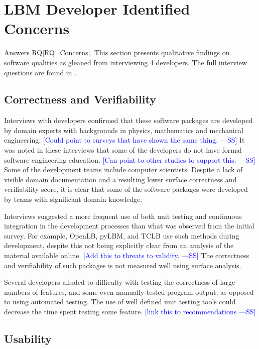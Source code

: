 \documentclass[final, 3p, times, authoryear]{elsarticle}
\newcommand{\authornote}[3]{\textcolor{#1}{[#3 ---#2]}}
\newcommand{\authornote}[3]{}
\newcommand{\wss}[1]{\authornote{blue}{SS}{#1}} %
\newcommand{\rqref}[1]{RQ\ref{#1}}
\begin{document}
\section{LBM Developer Identified Concerns} \label{Sec_Concerns}

Answers \rqref{RQ_Concerns}.  This section presents qualitative findings on
software qualities as gleaned from interviewing 4 developers. The full interview
questions are found in \citet{SmithEtAl2021}.

\subsection{Correctness and Verifiability}

Interviews with developers confirmed that these software packages are developed
by domain experts with backgrounds in physics, mathematics and mechanical
engineering. \wss{Could point to surveys that have shown the same thing.}  It
was noted in these interviews that some of the developers do not have formal
software engineering education. \wss{Can point to other studies to support
this.} Some of the development teams include computer scientists. Despite a lack
of visible domain documentation and a resulting lower surface correctness and
verifiability score, it is clear that some of the software packages were
developed by teams with significant domain knowledge. 

Interviews suggested a more frequent use of both unit testing and continuous
integration in the development processes than what was observed from the initial
survey. For example, OpenLB, pyLBM, and TCLB use such methods during development,
despite this not being explicitly clear from an analysis of the material
available online. \wss{Add this to threats to validity.}  The correctness and
verifiability of such packages is not measured well using surface analysis.

Several developers alluded to difficulty with testing the correctness of large
numbers of features, and some even manually tested program output, as opposed to
using automated testing. The use of well defined unit testing tools could
decrease the time spent testing some feature.  \wss{link this to
recommendations}

\subsection{Usability}
\end{document}
